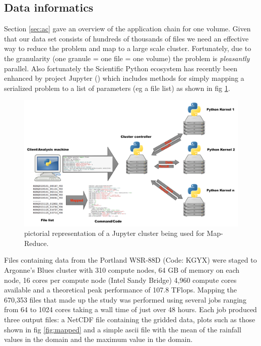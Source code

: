 \documentclass[twocol]{ametsoc}
\begin{document}
\subsection{Data informatics}
Section \ref{sec:ac} gave an overview of the application chain for one volume. Given that our data set consists of hundreds of thousands of files 
we need an effective way to reduce the problem and map to a large scale cluster. Fortunately, due to the granularity (one granule = one file = one volume) 
the problem is \textit{pleasantly} parallel. Also fortunately the Scientific Python ecosystem has recently been enhanced by project Jupyter (\cite{jupyter})
which includes methods for simply mapping a serialized problem to a list of parameters (eg a file list) as shown in fig \ref{fig:cluster}. 
\begin{figure}[h]
    \centering
    \includegraphics[width=0.95\columnwidth]{cluster.png}
    \caption{pictorial representation of a Jupyter cluster being used for Map-Reduce.  }
    \label{fig:cluster}
\end{figure}

Files containing data from the Portland WSR-88D (Code: KGYX) were staged to Argonne's Blues cluster with 310 compute nodes, 
64 GB of memory on each node, 16 cores per compute node (Intel Sandy Bridge) 4,960 compute cores available and a theoretical
 peak performance of 107.8 TFlops. Mapping the 670,353 files that made up the study was performed using several jobs ranging from
 64 to 1024 cores taking a wall time of just over 48 hours. Each job produced three output files: a NetCDF file containing the gridded data,
 plots such as those shown in fig \ref{fig:mapped} and a simple ascii file with the mean of the rainfall values in the domain and the 
 maximum value in the domain.
 
\end{document}
